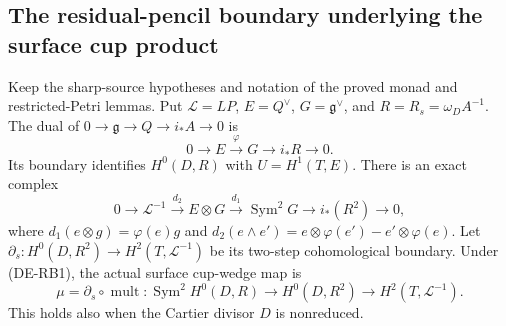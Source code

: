 \subsection{The residual-pencil boundary underlying the surface cup product}

\begin{lemma}
\label{lem:DE-A3-residual-pencil-boundary}
Keep the sharp-source hypotheses and notation of the proved monad and
restricted-Petri lemmas. Put $\mathcal L=LP$, $E=Q^\vee$,
$G=\mathfrak g^\vee$, and $R=R_s=\omega_D A^{-1}$.
The dual of $0\to\mathfrak g\to Q\to i_*A\to0$ is
\[
0\longrightarrow E\xrightarrow{\varphi}G
\longrightarrow i_*R\longrightarrow0.
\tag{DE-RB1}
\]
Its boundary identifies $H^0(D,R)$ with $U=H^1(T,E)$.
There is an exact complex
\[
0\longrightarrow\mathcal L^{-1}
\xrightarrow{d_2}E\otimes G\xrightarrow{d_1}
\operatorname{Sym}^2G\longrightarrow i_*(R^2)
\longrightarrow0,
\tag{DE-RB2}
\]
where $d_1(e\otimes g)=\varphi(e)g$ and
$d_2(e\wedge e')=e\otimes\varphi(e')-e'\otimes\varphi(e)$.
Let $\partial_s:H^0(D,R^2)\to H^2(T,\mathcal L^{-1})$
be its two-step cohomological boundary. Under (DE-RB1), the
actual surface cup-wedge map is
\[
\mu=\partial_s\circ\operatorname{mult}:
\operatorname{Sym}^2H^0(D,R)\longrightarrow H^0(D,R^2)
\longrightarrow H^2(T,\mathcal L^{-1}).
\tag{DE-RB3}
\]
This holds also when the Cartier divisor $D$ is nonreduced.
\end{lemma}
